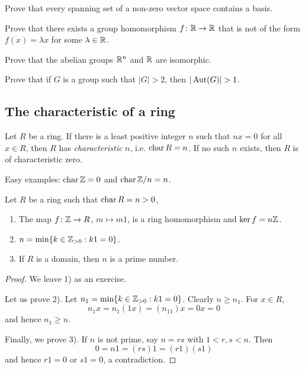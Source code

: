 \begin{bonus}
    Prove that every spanning set of a non-zero vector space
    contains a basis. 
\end{bonus}

\begin{bonus}
\label{xca:fx=cx}
    Prove that there exists a group homomorphism $f\colon\mathbb{R}\to\mathbb{R}$ that 
    is not of the form $f(x)=\lambda x$ for some $\lambda\in\mathbb{R}$. 
\end{bonus}


\begin{bonus}
\label{xca:Rn=R}
    Prove that the abelian groups $\mathbb{R}^n$ and $\mathbb{R}$ are isomorphic.
\end{bonus}

\begin{bonus}
\label{xca:aut}
    Prove that if $G$ is a group such that $|G|>2$, then $|\Aut(G)|>1$.
\end{bonus}

\subsection{The characteristic of a ring}

\begin{definition}
Let $R$ be a ring. If there is a least positive integer $n$ such that 
$nx=0$ for all $x\in R$, then $R$ has \emph{characteristic} $n$, i.e. $\operatorname{char} R=n$. If no such $n$ exists, 
then $R$ is of characteristic zero. 
\end{definition}

Easy examples: $\operatorname{char}\mathbb{Z}=0$ and $\operatorname{char}\mathbb{Z}/n=n$.

\begin{proposition}
    Let $R$ be a ring such that $\operatorname{char} R=n>0$,
    \begin{enumerate}
        \item The map $f\colon \mathbb{Z}\to R$, $m\mapsto m1$, is a ring homomorphism and $\ker f=n\mathbb{Z}$.  
        \item $n=\min\{k\in\mathbb{Z}_{>0}:k1=0\}$.
        \item If $R$ is a domain, then $n$ is a prime number.
    \end{enumerate}
\end{proposition}

\begin{proof}
    We leave 1) as an exercise. 
    
    Let us prove 2). Let $n_1=\min\{k\in\mathbb{Z}_{>0}:k1=0\}$. Clearly 
    $n\geq n_1$. For $x\in R$,
    \[ 
    n_1x=n_1(1x)=(n_11)x=0x=0
    \]
    and hence $n_1\geq n$. 
    
    Finally, we prove 3). If $n$ is not prime, say
    $n=rs$ with $1<r,s<n$. Then 
    \[
    0=n1=(rs)1=(r1)(s1)
    \]
    and hence $r1=0$ or $s1=0$, a contradiction. 
\end{proof}

